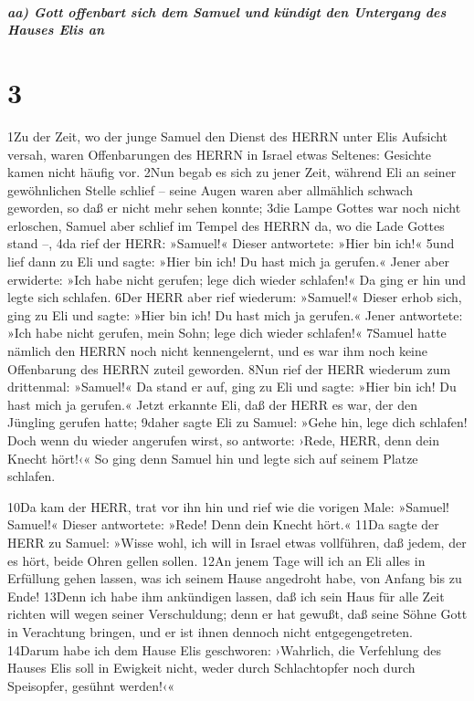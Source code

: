 \hypertarget{aa-gott-offenbart-sich-dem-samuel-und-kuxfcndigt-den-untergang-des-hauses-elis-an}{%
\subparagraph{aa) Gott offenbart sich dem Samuel und kündigt den
Untergang des Hauses Elis
an}\label{aa-gott-offenbart-sich-dem-samuel-und-kuxfcndigt-den-untergang-des-hauses-elis-an}}

\hypertarget{section-2}{%
\section{3}\label{section-2}}

1Zu der Zeit, wo der junge Samuel den Dienst des HERRN unter Elis
Aufsicht versah, waren Offenbarungen des HERRN in Israel etwas Seltenes:
Gesichte kamen nicht häufig vor. 2Nun begab es sich zu jener Zeit,
während Eli an seiner gewöhnlichen Stelle schlief -- seine Augen waren
aber allmählich schwach geworden, so daß er nicht mehr sehen konnte;
3die Lampe Gottes war noch nicht erloschen, Samuel aber schlief im
Tempel des HERRN da, wo die Lade Gottes stand --, 4da rief der HERR:
»Samuel!« Dieser antwortete: »Hier bin ich!« 5und lief dann zu Eli und
sagte: »Hier bin ich! Du hast mich ja gerufen.« Jener aber erwiderte:
»Ich habe nicht gerufen; lege dich wieder schlafen!« Da ging er hin und
legte sich schlafen. 6Der HERR aber rief wiederum: »Samuel!« Dieser
erhob sich, ging zu Eli und sagte: »Hier bin ich! Du hast mich ja
gerufen.« Jener antwortete: »Ich habe nicht gerufen, mein Sohn; lege
dich wieder schlafen!« 7Samuel hatte nämlich den HERRN noch nicht
kennengelernt, und es war ihm noch keine Offenbarung des HERRN zuteil
geworden. 8Nun rief der HERR wiederum zum drittenmal: »Samuel!« Da stand
er auf, ging zu Eli und sagte: »Hier bin ich! Du hast mich ja gerufen.«
Jetzt erkannte Eli, daß der HERR es war, der den Jüngling gerufen hatte;
9daher sagte Eli zu Samuel: »Gehe hin, lege dich schlafen! Doch wenn du
wieder angerufen wirst, so antworte: ›Rede, HERR, denn dein Knecht
hört!‹« So ging denn Samuel hin und legte sich auf seinem Platze
schlafen.

10Da kam der HERR, trat vor ihn hin und rief wie die vorigen Male:
»Samuel! Samuel!« Dieser antwortete: »Rede! Denn dein Knecht hört.« 11Da
sagte der HERR zu Samuel: »Wisse wohl, ich will in Israel etwas
vollführen, daß jedem, der es hört, beide Ohren gellen sollen. 12An
jenem Tage will ich an Eli alles in Erfüllung gehen lassen, was ich
seinem Hause angedroht habe, von Anfang bis zu Ende! 13Denn ich habe ihm
ankündigen lassen, daß ich sein Haus für alle Zeit richten will wegen
seiner Verschuldung; denn er hat gewußt, daß seine Söhne Gott in
Verachtung bringen, und er ist ihnen dennoch nicht entgegengetreten.
14Darum habe ich dem Hause Elis geschworen: ›Wahrlich, die Verfehlung
des Hauses Elis soll in Ewigkeit nicht, weder durch Schlachtopfer noch
durch Speisopfer, gesühnt werden!‹«

